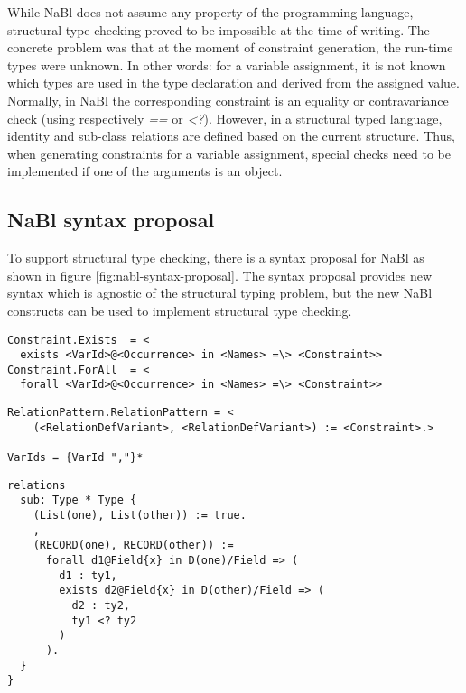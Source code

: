 While NaBl does not assume any property of the programming language, structural type checking proved to be impossible at the time of writing.
The concrete problem was that at the moment of constraint generation, the run-time types were unknown.
In other words: for a variable assignment, it is not known which types are used in the type declaration and derived from the assigned value.
Normally, in NaBl the corresponding constraint is an equality or contravariance check (using respectively \textit{==} or \textit{<?}).
However, in a structural typed language, identity and sub-class relations are defined based on the current structure.
Thus, when generating constraints for a variable assignment, special checks need to be implemented if one of the arguments is an object.

\subsection{NaBl syntax proposal}

To support structural type checking, there is a syntax proposal for NaBl as shown in figure \ref{fig:nabl-syntax-proposal}.
The syntax proposal provides new syntax which is agnostic of the structural typing problem, but the new NaBl constructs can be used to implement structural type checking.

\begin{figure*}
  \begin{lstlisting}[caption=New constraint syntax constructs for NaBl]
Constraint.Exists  = <
  exists <VarId>@<Occurrence> in <Names> =\> <Constraint>>
Constraint.ForAll  = <
  forall <VarId>@<Occurrence> in <Names> =\> <Constraint>>
  \end{lstlisting}
  \begin{lstlisting}[caption=New custom relation definition syntax]
RelationPattern.RelationPattern = <
	(<RelationDefVariant>, <RelationDefVariant>) := <Constraint>.>

VarIds = {VarId ","}*
  \end{lstlisting}
  \begin{lstlisting}[caption=Example usage of the new syntax constructs]
relations
  sub: Type * Type {
    (List(one), List(other)) := true.
    ,
    (RECORD(one), RECORD(other)) :=
      forall d1@Field{x} in D(one)/Field => (
        d1 : ty1,
        exists d2@Field{x} in D(other)/Field => (
          d2 : ty2,
          ty1 <? ty2
        )
      ).
  }
}
  \end{lstlisting}
  \caption{The syntax proposal for NaBl using SDF3 templates.}
  \label{fig:nabl-syntax-proposal}
\end{figure*}
